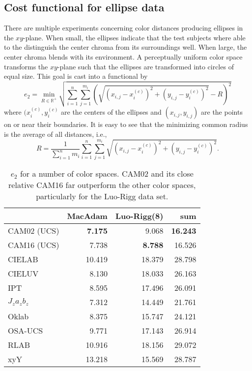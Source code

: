 \documentclass{scrartcl}
\theoremstyle{named}
\newcommand\R{\ensuremath{\mathbb{R}}}
\begin{document}
\subsection{Cost functional for ellipse data}

There are multiple experiments concerning color distances producing ellipses in
the $xy$-plane.
When small, the ellipses indicate that the test subjects where able to the distinguish
the center chroma from its surroundings well. When large, the center chroma blends with
its environment. A perceptually uniform color space transforms the $xy$-plane such that
the ellipses are transformed into circles of equal size. This goal is cast into a
functional by
\[
  e_2
  = \min_{R\in\R^+} \sqrt{\sum_{i=1}^n \sum_{j=1}^{m_i} \left(
  \sqrt{\left(x_{i,j} - x^{(c)}_i\right)^2 + \left(y_{i,j} - y^{(c)}_i\right)^2} - R
  \right)^2}
\]
where $(x^{(c)}_i, y^{(c)}_i$ are the centers of the ellipses and $(x_{i,j}, y_{i,j})$
are the points on or near their boundaries. It is easy to see that the minimizing common
radius is the average of all distances, i.e.,
\[
  R = \frac{1}{\sum_{i=1}^n m_i} \sum_{i=1}^n \sum_{j=1}^{m_i} \sqrt{\left(x_{i,j} -
  x^{(c)}_i\right)^2 + \left(y_{i,j} - y^{(c)}_i\right)^2}.
\]


\begin{table}
  \centering
  \begin{tabular}{lrrr}
    \toprule
    & MacAdam & Luo-Rigg(8) & sum\\
    \midrule
CAM02 (UCS)   & \textbf{7.175} &         9.068  & \textbf{16.243}\\
CAM16 (UCS)   &         7.738  & \textbf{8.788} &         16.526\\
CIELAB        &        10.419  &        18.379  &         28.798\\
CIELUV        &         8.130  &        18.033  &         26.163\\
IPT           &         8.595  &        17.496  &         26.091\\
$J_z a_z b_z$ &         7.312  &        14.449  &         21.761\\
Oklab         &         8.375  &        15.747  &         24.121\\
OSA-UCS       &         9.771  &        17.143  &         26.914\\
RLAB          &        10.916  &        18.156  &         29.072\\
xyY           &        13.218  &        15.569  &         28.787\\
    \bottomrule
  \end{tabular}
  \caption{$e_2$ for a number of color spaces. CAM02 and its close relative CAM16
  far outperform the other color spaces, particularly for the Luo-Rigg data set.}
\end{table}
\end{document}
